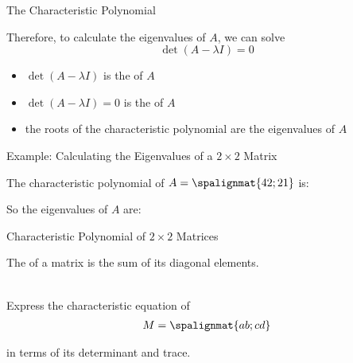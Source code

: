 \begin{frame}{The Characteristic Polynomial}

	\vspace{-2pt}
    \begin{center}\end{center}
    

Therefore, to calculate the eigenvalues of $A$, we can solve
\[ 
\det(A-\lambda I)= 0
\]

\pause

\begin{itemize}
    \item $\det(A-\lambda I)$ is the  of $A$
    \item $\det(A-\lambda I)=0$ is the   of $A$
    \item the roots of the characteristic polynomial are the eigenvalues of $A$
\end{itemize}



\end{frame}

\begin{frame}{Example: Calculating the Eigenvalues of a $2\times2$ Matrix}

The characteristic polynomial of $A = \spalignmat{ 4 2 ; 2 1} $ is: 

\vspace{2cm}

So the eigenvalues of $A$ are:

\end{frame}




\begin{frame}{Characteristic Polynomial of $2 \times 2$ Matrices}

    The  of a matrix is the sum of its diagonal elements. 
    
    \vspace{12pt}
    
     \\ Express the characteristic equation of
    \begin{align*}
       M = \spalignmat{ a b ; c d }
    \end{align*}
    
    in terms of its determinant and trace. 

\end{frame}





